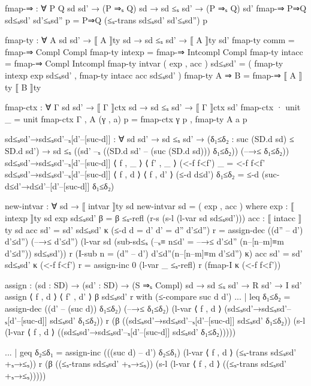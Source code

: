 \documentclass{article}
\begin{document}
\begin{prev}
\begin{code}
fmap-⇒ : ∀ {P Q sd sd'} → (P ⇒ₛ Q) sd → sd ≤ₛ sd' → (P ⇒ₛ Q) sd'
fmap-⇒ P⇒Q sd≤ₛsd' sd'≤ₛsd'' p = P⇒Q (≤ₛ-trans sd≤ₛsd' sd'≤ₛsd'') p

fmap-ty : ∀ {A sd sd'} → ⟦ A ⟧ty sd → sd ≤ₛ sd' → ⟦ A ⟧ty sd'
fmap-ty {comm}  = fmap-⇒ {Compl} {Compl}
fmap-ty {intexp} = fmap-⇒ {Intcompl} {Compl}
fmap-ty {intacc} = fmap-⇒ {Compl} {Intcompl}
fmap-ty {intvar} ( exp , acc ) sd≤ₛsd' = 
    ( fmap-ty {intexp} exp sd≤ₛsd' , fmap-ty {intacc} acc sd≤ₛsd' )
fmap-ty {A ⇒ B} = fmap-⇒ {⟦ A ⟧ty} {⟦ B ⟧ty}

fmap-ctx : ∀ {Γ sd sd'} → ⟦ Γ ⟧ctx sd → sd ≤ₛ sd' → ⟦ Γ ⟧ctx sd'
fmap-ctx {·} unit _ = unit
fmap-ctx {Γ , A} (γ , a) p = fmap-ctx γ p , fmap-ty {A} a p


sd≤ₛsd'→sd≤ₛsd'–ₛ[d'–[suc-d]] : ∀ {sd sd'} → sd ≤ₛ sd' 
    → (δ₁≤δ₂ : suc (SD.d sd) ≤ SD.d sd') 
    → sd ≤ₛ ((sd' –ₛ ((SD.d sd' – (suc (SD.d sd))) δ₁≤δ₂)) (–→≤ δ₁≤δ₂))
sd≤ₛsd'→sd≤ₛsd'–ₛ[d'–[suc-d]] {⟨ f , _ ⟩} {⟨ f' , _ ⟩} (<-f f<f') _ 
    = <-f f<f'
sd≤ₛsd'→sd≤ₛsd'–ₛ[d'–[suc-d]] {⟨ f , d ⟩} {⟨ f , d' ⟩} (≤-d d≤d') δ₁≤δ₂ 
    = ≤-d (suc-d≤d'→d≤d'–[d'–[suc-d]] δ₁≤δ₂)

new-intvar : ∀ sd → ⟦ intvar ⟧ty sd
new-intvar sd = ( exp , acc )
    where
        exp : ⟦ intexp ⟧ty sd
        exp sd≤ₛsd' β = β ≤ₛ-refl (r-s (s-l (l-var sd sd≤ₛsd')))
        acc : ⟦ intacc ⟧ty sd
        acc {sd' = sd'} sd≤ₛsd' κ (≤-d {d = d'} {d' = d''} d'≤d'') r
            = assign-dec 
                ((d'' – d') d'≤d'') (–→≤ d'≤d'') 
                (l-var sd
                   (sub-sd≤ₛ (–ₛ≡ {n≤d' = –→≤ d'≤d''} (n–[n–m]≡m d'≤d'')) sd≤ₛsd'))
                r
                (I-sub {n = (d'' – d') d'≤d''}(n–[n–m]≡m d'≤d'') κ)
        acc {sd' = sd'} sd≤ₛsd' κ (<-f f<f') r 
            = assign-inc 0 (l-var _ ≤ₛ-refl) r (fmap-I κ (<-f f<f'))


assign : (sd : SD) → (sd' : SD) → (S ⇒ₛ Compl) sd 
            → sd ≤ₛ sd' → R sd' → I sd'
assign ⟨ f , d ⟩ ⟨ f' , d' ⟩ β sd≤ₛsd' r with (≤-compare {suc d} {d'})
... | leq δ₁≤δ₂ 
        = assign-dec 
            ((d' – (suc d)) δ₁≤δ₂) (–→≤ δ₁≤δ₂) 
              (l-var ⟨ f , d ⟩ 
                (sd≤ₛsd'→sd≤ₛsd'–ₛ[d'–[suc-d]] sd≤ₛsd' δ₁≤δ₂)) 
              r 
              (β ((sd≤ₛsd'→sd≤ₛsd'–ₛ[d'–[suc-d]] sd≤ₛsd' δ₁≤δ₂)) 
                (s-l (l-var ⟨ f , d ⟩ 
                  ((sd≤ₛsd'→sd≤ₛsd'–ₛ[d'–[suc-d]] sd≤ₛsd' δ₁≤δ₂)))))


... | geq δ₂≤δ₁ = assign-inc (((suc d) – d') δ₂≤δ₁) 
                  (l-var ⟨ f , d ⟩ (≤ₛ-trans sd≤ₛsd' +ₛ→≤ₛ)) r 
                  (β ((≤ₛ-trans sd≤ₛsd' +ₛ→≤ₛ)) 
                    (s-l (l-var ⟨ f , d ⟩ ((≤ₛ-trans sd≤ₛsd' +ₛ→≤ₛ)))))


\end{code}
\end{prev}
\end{document}

